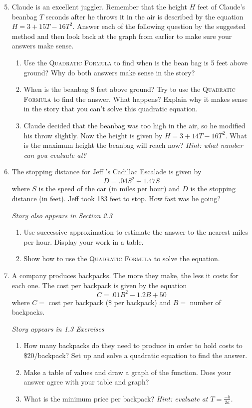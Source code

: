 \begin{enumerate} 
\setcounter{enumi}{4}

\item Claude is an excellent juggler.  Remember that the height $H$ feet of Claude's beanbag $T$ seconds after he throws it in the air is described by the equation $H = 3+15T-16T^2$. Answer each of the following question by the suggested method and then look back at the graph from earlier to make sure your answers make sense.
\begin{enumerate}
\item Use the \textsc{Quadratic Formula} to find when is the bean bag is 5 feet above ground?  Why do both answers make sense in the story?
\item When is the beanbag 8 feet above ground?  Try to use the \textsc{Quadratic Formula} to find the answer.  What happens?  Explain why it makes sense in the story that you can't solve this quadratic equation.
\item Claude decided that the beanbag was too high in the air, so he modified his throw slightly.  Now the height is given by $H = 3+14T-16T^2$.  What is the maximum height the beanbag will reach now?  \emph{Hint:  what number can you evaluate at?}
\end{enumerate}

\item The stopping distance for Jeff 's Cadillac Escalade is given by  $$D=.04S^2+1.47S$$ where $S$ is the speed of the car (in miles per hour) and $D$ is the stopping distance (in feet). Jeff took 183 feet to stop.  How fast was he going? 

\hfill \emph{Story also appears in Section 2.3}
\begin{enumerate}
\item Use successive approximation to estimate the answer to the nearest miles per hour.  Display your work in a table.
\item Show how to use the \textsc{Quadratic Formula} to solve the equation.
\end{enumerate}

\item A company produces backpacks.  The more they make, the less it costs for each one. The cost per backpack is given by the equation $$C = .01B^2 -1.2B + 50$$ where $C=$ cost per backpack (\$ per backpack) and $B=$ number of backpacks.

\hfill \emph{Story appears in 1.3 Exercises}
\begin{enumerate}
\item How many backpacks do they need to produce in order to hold costs to \$20/backpack?  Set up and solve a quadratic equation to find the answer.
\item Make a table of values and draw a graph of the function. Does your answer agree with your table and graph?  
\item What is the minimum price per backpack?  \emph{Hint:  evaluate at $T= \frac{-b}{2a}$.}
\end{enumerate}


\end{enumerate}
